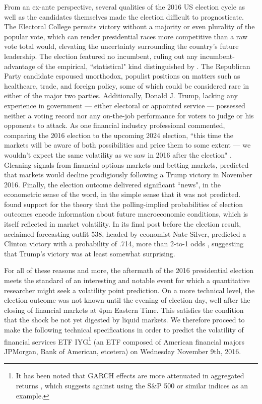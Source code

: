 \documentclass[11pt]{article}
\theoremstyle{definition}
\begin{document}
From an ex-ante perspective, several qualities of the 2016 US election cycle as well as the candidates themselves made the election difficult to prognosticate.  The Electoral College permits victory without a majority or even plurality of the popular vote, which can render presidential races more competitive than a raw vote total would, elevating the uncertainty surrounding the country's future leadership.  The election featured no incumbent, ruling out any incumbent-advantage of the empirical, ``statistical" kind distinguished by \citet{mayhew2008incumbency}.  The Republican Party candidate espoused unorthodox, populist positions on matters such as healthcare, trade, and foreign policy, some of which could be considered rare in either of the major two parties.  Additionally, Donald J. Trump, lacking any experience in government --- either electoral or appointed service --- possessed neither a voting record nor any on-the-job performance for voters to judge or his opponents to attack. As one financial industry professional commented, comparing the 2016 election to the upcoming 2024 election, ``this time the markets will be aware of both possibilities and price them to some extent — we wouldn’t expect the same volatility as we saw in 2016 after the election" \citep{News_2024}. Gleaning signals from financial options markets and betting markets, \citet{wolfers2016financial} predicted that markets would decline prodigiously following a Trump victory in November 2016.  Finally, the election outcome delivered significant ``news", in the econometric sense of the word, in the simple sense that it was not predicted.  \citet{goodell2013us} found support for the theory that the polling-implied probabilities of election outcomes encode information about future macroeconomic conditions, which is itself reflected in market volatility.  In its final post before the election result, acclaimed forecasting outfit 538, headed by economist Nate Silver, predicted a Clinton victory with a probability of .714, more than 2-to-1 odds \citep{Silver_2016}, suggesting that Trump's victory was at least somewhat surprising.  

For all of these reasons and more, the aftermath of the 2016 presidential election meets the standard of an interesting and notable event for which a quantitative researcher might seek a volatility point prediction.  On a more technical level, the election outcome was not known until the evening of election day, well after the closing of financial markets at 4pm Eastern Time.  This satisfies the condition that the shock be not yet digested by liquid markets.  We therefore proceed to make the following technical specifications in order to predict the volatility of financial services ETF IYG\footnote{It has been noted that GARCH effects are more attenuated in aggregated returns \citep{zivot2009practical}, which suggests against using the S\&P 500 or similar indices as an example.} (an ETF composed of American financial majors JPMorgan, Bank of American, etcetera) on Wednesday November 9th, 2016.
\end{document}
